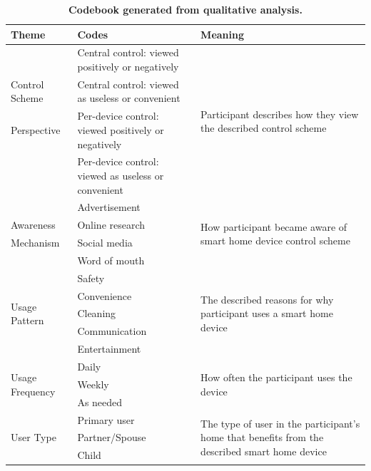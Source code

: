 \renewcommand{\arraystretch}{0.75}
\begin{table}
    \footnotesize
    \centering
    \caption{\bf \small Codebook generated from qualitative analysis.}
    \bigskip
    \label{cic:table:codes}
    \begin{tabular}{p{}|p{}|p{}}
    \hline
        \textbf{Theme} & \textbf{Codes} & \textbf{Meaning} \\ 
        \hline\hline
            & Central control: viewed positively or negatively  & \multirow{4}{4cm}{Participant describes how they view the described control scheme} \\
            Control Scheme & Central control: viewed as useless or convenient \\
            Perspective & Per-device control: viewed positively or negatively \\
            & Per-device control: viewed as useless or convenient \\
        \hline
            & Advertisement & \multirow{4}{4cm}{How participant became aware of smart home device control scheme} \\ 
            Awareness & Online research \\
            Mechanism & Social media \\
            & Word of mouth \\
        \hline
            \multirow{5}{*}{Usage Pattern} & Safety & \multirow{5}{4cm}{The described reasons for why participant uses a smart home device} \\
            & Convenience \\
            & Cleaning \\
            & Communication \\
            & Entertainment \\
        \hline
            \multirow{3}{*}{Usage Frequency} & Daily & \multirow{3}{4cm}{How often the participant uses the device} \\
            & Weekly \\
            & As needed \\
        \hline
            \multirow{5}{*}{User Type} & Primary user & \multirow{5}{4.2cm}{The type of user in the participant's home that benefits from the described smart home device} \\
            & Partner/Spouse \\
            & Child \\

\end{tabular}
\end{table}
